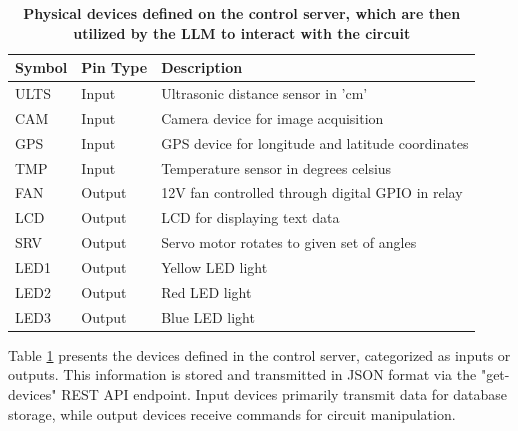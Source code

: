 \documentclass[lettersize,journal]{IEEEtran}
\begin{document}
\begin{table}[!h]
    \caption{\textbf{Physical devices defined on the control server, which are then utilized by the LLM to interact with the circuit}}
    \label{table1}
    \setlength{\tabcolsep}{3pt}
    \begin{tabular}{|p{30pt}|p{32pt}|p{165pt}|}
        \hline
        \textbf{Symbol} &
        \textbf{Pin Type}   &
        \textbf{Description}                                             \\
        \hline
        ULTS   &
        Input  &
        Ultrasonic distance sensor in 'cm'                      \\
        \hline
        CAM    &
        Input  &
        Camera device for image acquisition                       \\
        \hline
        GPS    &
        Input  &
        GPS device for longitude and latitude coordinates       \\
        \hline
        TMP    &
        Input  &
        Temperature sensor in degrees celsius    \\
        \hline
        FAN    &
        Output &
        12V fan controlled through digital GPIO in relay \\
        \hline
        LCD    &
        Output &
        LCD for displaying text data                          \\
        \hline
        SRV    &
        Output &
        Servo motor rotates to given set of angles         \\
        \hline
        LED1   &
        Output &
        Yellow LED light                                        \\
        \hline
        LED2   &
        Output &
        Red LED light                                           \\
        \hline
        LED3   &
        Output &
        Blue LED light                                          \\
        \hline
    \end{tabular}
\end{table}

Table \ref{table1} presents the devices defined in the control server, categorized as inputs or outputs. This information is stored and transmitted in JSON format via the "get-devices" REST API endpoint. Input devices primarily transmit data for database storage, while output devices receive commands for circuit manipulation.
\end{document}
